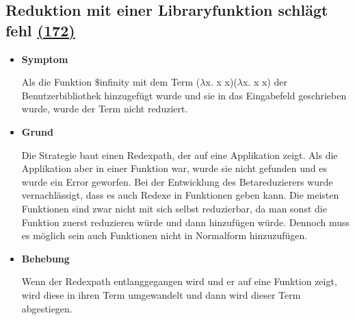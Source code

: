 \documentclass[parskip=full,11pt,twoside]{scrartcl}
\newcommand{\issueref}[1]{
    \href{https://git.scc.kit.edu/ap/Aurora/issues/#1}{(#1)}
}
\newcommand{\regrtest}[5]{
    \subsection{#1 \issueref{#2}}
    \begin{itemize}
        \item \textbf{Symptom}
            #3
        \item \textbf{Grund}
            #4
        \item \textbf{Behebung}
            #5
    \end{itemize}
}
\begin{document}
\regrtest{Reduktion mit einer Libraryfunktion schlägt fehl}{172}{
	Als die Funktion $\$$infinity mit dem Term ($\lambda$x. x x)($\lambda$x. x x) der
	Benutzerbibliothek hinzugefügt wurde und sie in
	das Eingabefeld geschrieben wurde, wurde der Term nicht reduziert.
}{
Die Strategie baut einen Redexpath, der auf eine Applikation zeigt.
Als die Applikation aber in einer Funktion war, wurde sie nicht gefunden und es wurde ein Error geworfen.
Bei der Entwicklung des Betareduzierers wurde vernachlässigt, dass es auch Redexe in Funktionen geben kann.
Die meisten Funktionen sind zwar nicht mit sich selbst reduzierbar, da man sonst die Funktion zuerst reduzieren würde und dann hinzufügen würde.
Dennoch muss es möglich sein auch Funktionen nicht in Normalform hinzuzufügen.
}{
Wenn der Redexpath entlanggegangen wird und er auf eine Funktion zeigt, wird diese in ihren Term umgewandelt und dann wird dieser Term abgestiegen.
}
\end{document}
